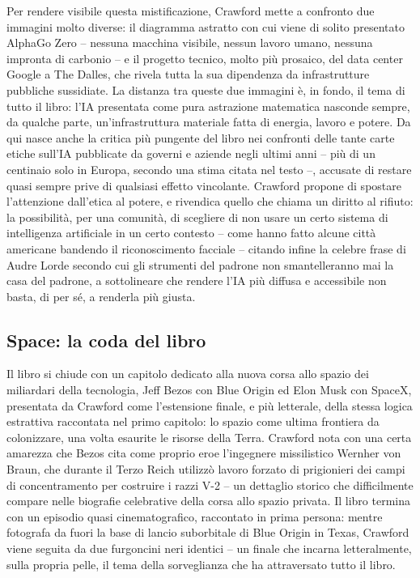 \documentclass[a4paper,11pt]{article}
\begin{document}
Per rendere visibile questa mistificazione, Crawford mette a confronto due immagini molto diverse: il diagramma astratto con cui viene di solito presentato AlphaGo Zero -- nessuna macchina visibile, nessun lavoro umano, nessuna impronta di carbonio -- e il progetto tecnico, molto più prosaico, del data center Google a The Dalles, che rivela tutta la sua dipendenza da infrastrutture pubbliche sussidiate. La distanza tra queste due immagini è, in fondo, il tema di tutto il libro: l'IA presentata come pura astrazione matematica nasconde sempre, da qualche parte, un'infrastruttura materiale fatta di energia, lavoro e potere. Da qui nasce anche la critica più pungente del libro nei confronti delle tante carte etiche sull'IA pubblicate da governi e aziende negli ultimi anni -- più di un centinaio solo in Europa, secondo una stima citata nel testo --, accusate di restare quasi sempre prive di qualsiasi effetto vincolante. Crawford propone di spostare l'attenzione dall'etica al potere, e rivendica quello che chiama un diritto al rifiuto: la possibilità, per una comunità, di scegliere di non usare un certo sistema di intelligenza artificiale in un certo contesto -- come hanno fatto alcune città americane bandendo il riconoscimento facciale -- citando infine la celebre frase di Audre Lorde secondo cui gli strumenti del padrone non smantelleranno mai la casa del padrone, a sottolineare che rendere l'IA più diffusa e accessibile non basta, di per sé, a renderla più giusta.

\subsection{Space: la coda del libro}

Il libro si chiude con un capitolo dedicato alla nuova corsa allo spazio dei miliardari della tecnologia, Jeff Bezos con Blue Origin ed Elon Musk con SpaceX, presentata da Crawford come l'estensione finale, e più letterale, della stessa logica estrattiva raccontata nel primo capitolo: lo spazio come ultima frontiera da colonizzare, una volta esaurite le risorse della Terra. Crawford nota con una certa amarezza che Bezos cita come proprio eroe l'ingegnere missilistico Wernher von Braun, che durante il Terzo Reich utilizzò lavoro forzato di prigionieri dei campi di concentramento per costruire i razzi V-2 -- un dettaglio storico che difficilmente compare nelle biografie celebrative della corsa allo spazio privata. Il libro termina con un episodio quasi cinematografico, raccontato in prima persona: mentre fotografa da fuori la base di lancio suborbitale di Blue Origin in Texas, Crawford viene seguita da due furgoncini neri identici -- un finale che incarna letteralmente, sulla propria pelle, il tema della sorveglianza che ha attraversato tutto il libro.
\end{document}
